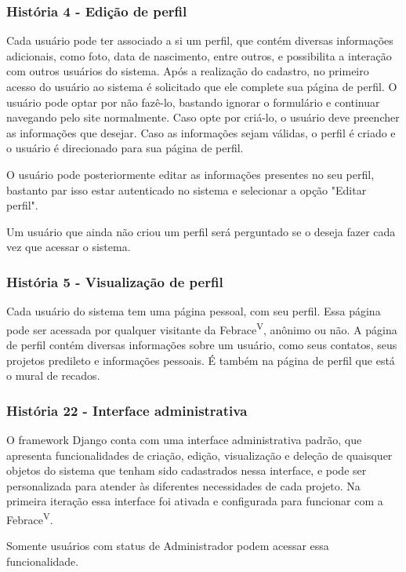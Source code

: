     \subsubsection{História 4 - Edição de perfil}
      Cada usuário pode ter associado a si um perfil, que contém diversas informações adicionais, como foto, data de nascimento, entre outros, e possibilita a interação com outros usuários do sistema. Após a realização do cadastro, no primeiro acesso do usuário ao sistema é solicitado que ele complete sua página de perfil. O usuário pode optar por não fazê-lo, bastando ignorar o formulário e continuar navegando pelo site normalmente. Caso opte por criá-lo, o usuário deve preencher as informações que desejar. Caso as informações sejam válidas, o perfil é criado e o usuário é direcionado para sua página de perfil.

      O usuário pode posteriormente editar as informações presentes no seu perfil, bastanto par isso estar autenticado no sistema e selecionar a opção "Editar perfil".

      Um usuário que ainda não criou um perfil será perguntado se o deseja fazer cada vez que acessar o sistema.

    \subsubsection{História 5 - Visualização de perfil}
      Cada usuário do sistema tem uma página pessoal, com seu perfil. Essa página pode ser acessada por qualquer visitante da Febrace\textsuperscript{V}, anônimo ou não. A página de perfil contém diversas informações sobre um usuário, como seus contatos, seus projetos predileto e informações pessoais. É também na página de perfil que está o mural de recados.

    \subsubsection{História 22 - Interface administrativa}
      O framework Django conta com uma interface administrativa padrão, que apresenta funcionalidades de criação, edição, visualização e deleção de quaisquer objetos do sistema que tenham sido cadastrados nessa interface, e pode ser personalizada para atender às diferentes necessidades de cada projeto. Na primeira iteração essa interface foi ativada e configurada para funcionar com a Febrace\textsuperscript{V}.

      Somente usuários com status de Administrador podem acessar essa funcionalidade.

